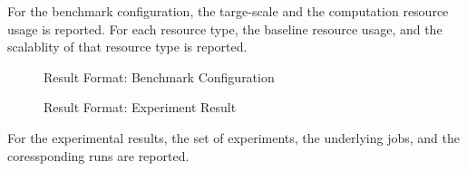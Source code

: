 For the benchmark configuration, the targe-scale and the computation resource usage is reported. For each resource type, the baseline resource usage, and the scalablity of that resource type is reported.

\begin{figure}[!h]
	\centering
	\caption{Result Format: Benchmark Configuration}
	\label{fig:result-format:conf}
\end{figure}

\begin{figure}[!h]
	\centering
	\caption{Result Format: Experiment Result}
	\label{fig:result-format:result}
\end{figure}

For the experimental results, the set of experiments, the underlying jobs, and the coressponding runs are reported.
